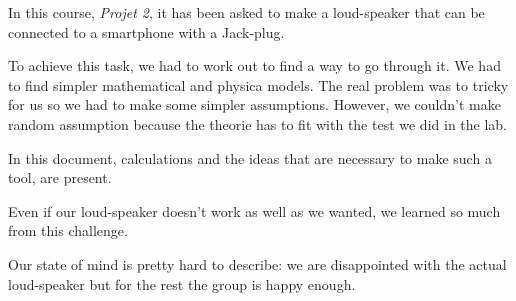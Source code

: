 

\begin{abstract-en}


In this course, \textit{Projet 2}, it has been asked to make a loud-speaker that can be connected to a smartphone with a Jack-plug.

To achieve this task, we had to work out to find a way to go through it.  We had to find simpler mathematical and physica models.  
The real problem was to tricky for us so we had to make some simpler assumptions.  However, we couldn't make random assumption because the theorie has to fit with the test we did in the lab.

In this document, calculations and the ideas that are necessary to make such a tool, are present.

Even if our loud-speaker doesn't work as well as we wanted, we learned so much from this challenge.

Our state of mind is pretty hard to describe: we are disappointed with the actual loud-speaker but for the rest the group is happy enough.


\end{abstract-en}


